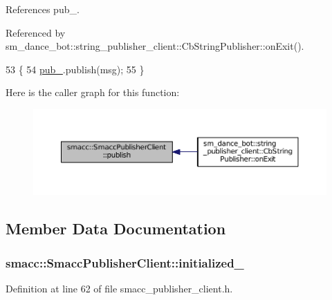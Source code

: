 References pub\+\_\+.



Referenced by sm\+\_\+dance\+\_\+bot\+::string\+\_\+publisher\+\_\+client\+::\+Cb\+String\+Publisher\+::on\+Exit().


\begin{DoxyCode}
53   \{
54     \hyperlink{classsmacc_1_1SmaccPublisherClient_a674fc5715c4983d093c8ae387232ae55}{pub\_}.publish(msg);
55   \}
\end{DoxyCode}


Here is the caller graph for this function\+:
\nopagebreak
\begin{figure}[H]
\begin{center}
\leavevmode
\includegraphics[width=350pt]{classsmacc_1_1SmaccPublisherClient_ab82b8234c5bbedf393b70cff442bd5be_icgraph}
\end{center}
\end{figure}




\subsection{Member Data Documentation}
\subsubsection[{\texorpdfstring{initialized\+\_\+}{initialized_}}]{ smacc\+::\+Smacc\+Publisher\+Client\+::initialized\+\_\+\hspace{0.3cm}{\ttfamily [private]}}\hypertarget{classsmacc_1_1SmaccPublisherClient_affbfbaa739a6de9f118c551c56b09dfe}{}\label{classsmacc_1_1SmaccPublisherClient_affbfbaa739a6de9f118c551c56b09dfe}


Definition at line 62 of file smacc\+\_\+publisher\+\_\+client.\+h.



